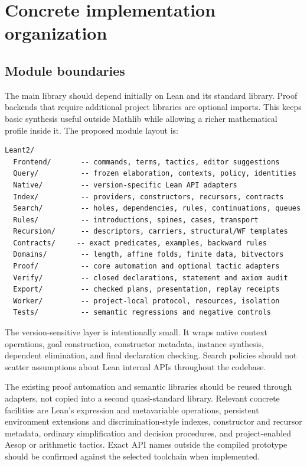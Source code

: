 \section{Concrete implementation organization}
\label{sec:implementation}
\subsection{Module boundaries}
The main library should depend initially on Lean and its standard library. Proof backends that require additional project libraries are optional imports. This keeps basic synthesis useful outside Mathlib while allowing a richer mathematical profile inside it. The proposed module layout is:
\begin{lstlisting}
Leant2/
  Frontend/       -- commands, terms, tactics, editor suggestions
  Query/          -- frozen elaboration, contexts, policy, identities
  Native/         -- version-specific Lean API adapters
  Index/          -- providers, constructors, recursors, contracts
  Search/         -- holes, dependencies, rules, continuations, queues
  Rules/          -- introductions, spines, cases, transport
  Recursion/      -- descriptors, carriers, structural/WF templates
  Contracts/     -- exact predicates, examples, backward rules
  Domains/        -- length, affine folds, finite data, bitvectors
  Proof/          -- core automation and optional tactic adapters
  Verify/         -- closed declarations, statement and axiom audit
  Export/         -- checked plans, presentation, replay receipts
  Worker/         -- project-local protocol, resources, isolation
  Tests/          -- semantic regressions and negative controls
\end{lstlisting}
The version-sensitive layer is intentionally small. It wraps native context operations, goal construction, constructor metadata, instance synthesis, dependent elimination, and final declaration checking. Search policies should not scatter assumptions about Lean internal APIs throughout the codebase.

The existing proof automation and semantic libraries should be reused through adapters, not copied into a second quasi-standard library. Relevant concrete facilities are Lean's expression and metavariable operations, persistent environment extensions and discrimination-style indexes, constructor and recursor metadata, ordinary simplification and decision procedures, and project-enabled Aesop or arithmetic tactics. Exact API names outside the compiled prototype should be confirmed against the selected toolchain when implemented.

